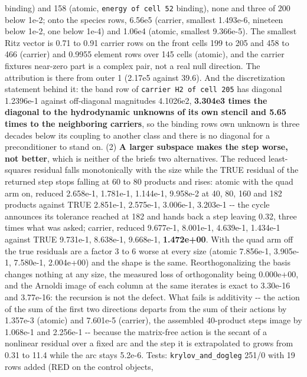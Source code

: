 \documentclass[english,a4paper]{my_memo}
\begin{document}
\begin{itemize}
  binding) and 158 (atomic, \texttt{energy\ of\ cell\ 52} binding), none and three of
  200 below 1e-2; onto the species rows, 6.56e5 (carrier, smallest
  1.493e-6, nineteen below 1e-2, one below 1e-4) and 1.06e4 (atomic,
  smallest 9.366e-5). The smallest Ritz vector is 0.71 to 0.91 carrier rows
  on the front cells 199 to 205 and 458 to 466 (carrier) and 0.9955 element
  rows over 145 cells (atomic), and the carrier fixture\textquotesingle s near-zero part is
  a complex pair, not a real null direction. The attribution is there from
  outer 1 (2.17e5 against 39.6). And the discretization statement behind
  it: the band row of \texttt{carrier\ H2\ of\ cell\ 205} has diagonal 1.2396e-1
  against off-diagonal magnitudes 4.1026e2, \textbf{3.304e3 times the diagonal to
  the hydrodynamic unknowns of its own stencil and 5.65 times to the
  neighboring carriers}, so the binding row\textquotesingle s own unknown is three
  decades below its coupling to another class and there is no diagonal for
  a preconditioner to stand on. (2) \textbf{A larger subspace makes the step
  worse, not better}, which is neither of the brief\textquotesingle s two alternatives.
  The reduced least-squares residual falls monotonically with the size
  while the TRUE residual of the returned step stops falling at 60 to 80
  products and rises: atomic with the quad arm on, reduced 2.658e-1,
  1.781e-1, 1.144e-1, 9.958e-2 at 40, 80, 160 and 182 products against TRUE
  2.851e-1, 2.575e-1, 3.006e-1, 3.203e-1 -\/- the cycle announces its
  tolerance reached at 182 and hands back a step leaving 0.32, three times
  what was asked; carrier, reduced 9.677e-1, 8.001e-1, 4.639e-1, 1.434e-1
  against TRUE 9.731e-1, 8.638e-1, 9.668e-1, \textbf{1.472e+00}. With the quad
  arm off the true residuals are a factor 3 to 6 worse at every size
  (atomic 7.856e-1, 3.905e-1, 7.580e-1, 2.004e+00) and the shape is the
  same. Reorthogonalizing the basis changes nothing at any size, the
  measured loss of orthogonality being 0.000e+00, and the
  Arnoldi image of each column at the same iterates is exact to 3.30e-16 and 3.77e-16: the
  recursion is not the defect. What fails is additivity -\/- the action of
  the sum of the first two directions departs from the sum of their actions
  by 1.357e-3 (atomic) and 7.601e-5 (carrier), the assembled 40-product
  step\textquotesingle s image by 1.068e-1 and 2.256e-1 -\/- because the matrix-free action
  is the secant of a nonlinear residual over a fixed arc and the step it is
  extrapolated to grows from 0.31 to 11.4 while the arc stays 5.2e-6. Tests:
  \texttt{krylov\_and\_dogleg} 251/0 with 19 rows added (RED on the control objects,

\end{itemize}
\end{document}
